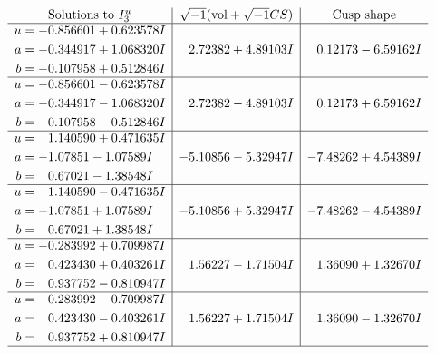 \documentclass[1p]{elsarticle_modified}
\theoremstyle{definition}
\newcommand{\I}{\sqrt{-1}}
\begin{document}
$$\begin{array}{c|c|c}  
\text{Solutions to }I^u_{3}& \I (\text{vol} + \sqrt{-1}CS) & \text{Cusp shape}\\
 \hline 
\begin{aligned}
u &= -0.856601 + 0.623578 I \\
a &= -0.344917 + 1.068320 I \\
b &= -0.107958 + 0.512846 I\end{aligned}
 & \phantom{-}2.72382 + 4.89103 I & \phantom{-}0.12173 - 6.59162 I \\ \hline\begin{aligned}
u &= -0.856601 - 0.623578 I \\
a &= -0.344917 - 1.068320 I \\
b &= -0.107958 - 0.512846 I\end{aligned}
 & \phantom{-}2.72382 - 4.89103 I & \phantom{-}0.12173 + 6.59162 I \\ \hline\begin{aligned}
u &= \phantom{-}1.140590 + 0.471635 I \\
a &= -1.07851 - 1.07589 I \\
b &= \phantom{-}0.67021 - 1.38548 I\end{aligned}
 & -5.10856 - 5.32947 I & -7.48262 + 4.54389 I \\ \hline\begin{aligned}
u &= \phantom{-}1.140590 - 0.471635 I \\
a &= -1.07851 + 1.07589 I \\
b &= \phantom{-}0.67021 + 1.38548 I\end{aligned}
 & -5.10856 + 5.32947 I & -7.48262 - 4.54389 I \\ \hline\begin{aligned}
u &= -0.283992 + 0.709987 I \\
a &= \phantom{-}0.423430 + 0.403261 I \\
b &= \phantom{-}0.937752 - 0.810947 I\end{aligned}
 & \phantom{-}1.56227 - 1.71504 I & \phantom{-}1.36090 + 1.32670 I \\ \hline\begin{aligned}
u &= -0.283992 - 0.709987 I \\
a &= \phantom{-}0.423430 - 0.403261 I \\
b &= \phantom{-}0.937752 + 0.810947 I\end{aligned}
 & \phantom{-}1.56227 + 1.71504 I & \phantom{-}1.36090 - 1.32670 I\\
 \hline 
 \end{array}$$\newpage\newpage\renewcommand{\arraystretch}{1}
\end{document}
